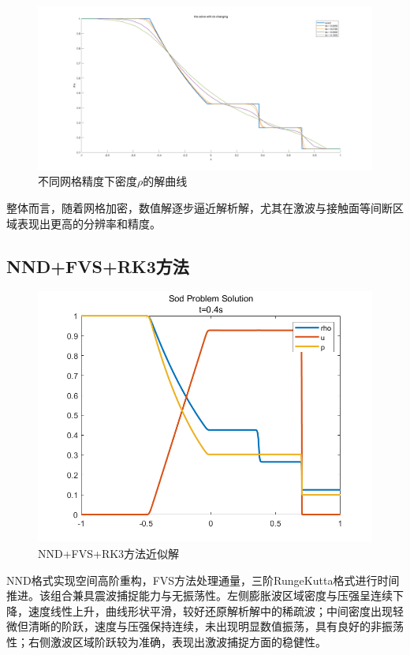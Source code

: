 \documentclass[12pt,a4paper]{article}%
\begin{document}
		\begin{figure}[H]
			\centering
			\begin{minipage}{0.83\textwidth}
				\centering
				\includegraphics[width=\textwidth]{./fig/rho.png}
				\caption{\fontsize{10pt}{15pt}\selectfont 不同网格精度下密度$\rho$的解曲线}
			\end{minipage}
		\end{figure}
		整体而言，随着网格加密，数值解逐步逼近解析解，尤其在激波与接触面等间断区域表现出更高的分辨率和精度。
		
		
		\subsection{NND+FVS+RK3方法}
		\begin{figure}[H]
			\centering
			\begin{minipage}{0.83\textwidth}
				\centering
				\includegraphics[width=\textwidth]{./fig/app1.png}
				\caption{\fontsize{10pt}{15pt}\selectfont NND+FVS+RK3方法近似解}
			\end{minipage}
		\end{figure}
		NND格式实现空间高阶重构，FVS方法处理通量，三阶RungeKutta格式进行时间推进。该组合兼具震波捕捉能力与无振荡性。左侧膨胀波区域密度与压强呈连续下降，速度线性上升，曲线形状平滑，较好还原解析解中的稀疏波；中间密度出现轻微但清晰的阶跃，速度与压强保持连续，未出现明显数值振荡，具有良好的非振荡性；右侧激波区域阶跃较为准确，表现出激波捕捉方面的稳健性。
		
\end{document}
